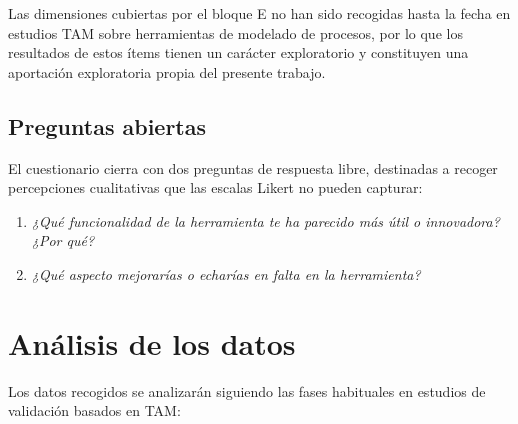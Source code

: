 Las dimensiones cubiertas por el bloque E no han sido recogidas hasta la fecha en estudios TAM sobre herramientas de modelado de procesos, por lo que los resultados de estos ítems tienen un carácter exploratorio y constituyen una aportación exploratoria propia del presente trabajo.

\subsection{Preguntas abiertas}
\label{subsec:preguntasAbiertas}

El cuestionario cierra con dos preguntas de respuesta libre, destinadas a recoger percepciones cualitativas que las escalas Likert no pueden capturar:

\begin{enumerate}
  \item \textit{¿Qué funcionalidad de la herramienta te ha parecido más útil o innovadora? ¿Por qué?}
  \item \textit{¿Qué aspecto mejorarías o echarías en falta en la herramienta?}
\end{enumerate}

\section{Análisis de los datos}
\label{sec:analisisPrevisto}

Los datos recogidos se analizarán siguiendo las fases habituales en estudios de validación basados en TAM:

